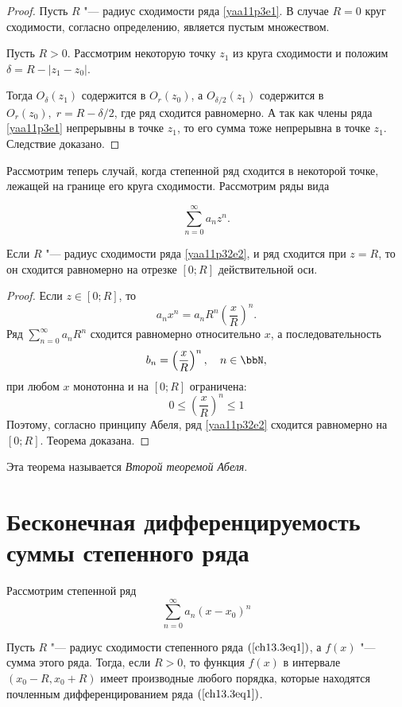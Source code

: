 \begin{proof}
Пусть $R$ "--- радиус сходимости ряда \eqref{yaa11p3e1}. В случае $R=0$ круг сходимости, согласно определению, является пустым множеством.

Пусть $R>0$. Рассмотрим некоторую точку $z_1$ из круга сходимости и положим $\delta=R-|z_1-z_0|$.

Тогда $O_{\delta}(z_1)$ содержится в $O_r(z_0)$, а $O_{\delta /2}(z_1)$ содержится в $O_r(z_0),\; r=R-\delta /2$, где ряд сходится равномерно. А так как члены ряда \eqref{yaa11p3e1} непрерывны в точке $z_1$, то его сумма тоже непрерывна в точке $z_1$. Следствие доказано.
\end{proof}

Рассмотрим теперь случай, когда степенной ряд сходится в некоторой точке, лежащей на границе его круга сходимости. Рассмотрим ряды вида

\begin{equation}\label{yaa11p32e2}
\sum\limits_{n=0}^{\infty} a_nz^n.
\end{equation}

\begin{thm}
Если $R$ "--- радиус сходимости ряда \eqref{yaa11p32e2}, и ряд сходится при $z=R$, то он сходится равномерно на отрезке $[0;R]$ действительной оси.
\end{thm}

\begin{proof}
Если $z\in[0;R]$, то
$$
a_nx^n=a_nR^n\left(\frac{x}{R}\right)^n.
$$
Ряд $\sum\limits_{n=0}^{\infty} a_nR^n$ сходится равномерно относительно $x$, а последовательность
$$
b_n=\left(\frac{x}{R}\right)^n,\quad n\in \bbN,
$$
при любом $x$ монотонна и на $[0;R]$ ограничена:
$$
0\le \left(\frac{x}{R}\right)^n\le 1
$$
Поэтому, согласно принципу Абеля, ряд \eqref{yaa11p32e2} сходится равномерно на $[0;R]$. Теорема доказана.
\end{proof}

Эта теорема называется \textit{Второй теоремой Абеля}.


\section{Бесконечная дифференцируемость суммы степенного ряда}
Рассмотрим степенной ряд
\begin{equation} \label{ch13.3eq1}
\sum\limits_{n = 0}^{\infty} a_n (x - x_0)^n
\end{equation}
\begin{thm} \label{ch13.3thm2}
Пусть $R$ "--- радиус сходимости степенного ряда $(\ref{ch13.3eq1})$, а $f(x)$ "--- сумма этого ряда. Тогда, если $R > 0$, то функция $f(x)$ в интервале $(x_0 - R, x_0 + R)$ имеет производные любого порядка, которые находятся почленным дифференцированием ряда $(\ref{ch13.3eq1})$.
\end{thm}

